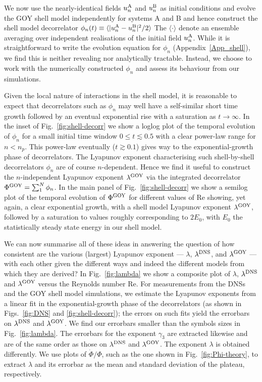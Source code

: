 \documentclass[amsmath,amssymb,amsbsy,pre,twocolumn,tightenlines,superscriptaddress,floatfix]{revtex4-2}
\begin{document}
We now use the nearly-identical fields $u_n^{\rm A}$ and $u_n^{\rm B}$ as
initial conditions and evolve the GOY shell model independently for systems A and B
and hence construct the shell model decorrelator $\phi_n (t) \equiv \langle |u_n^{\rm A} - u_n^{\rm B}|^2 / 2\rangle$
The $\langle \cdot \rangle$ denote an ensemble averaging over independent realisations of the initial field
$u_n^{\rm A}$. While it is straightforward to write the evolution equation for $\phi_n$ (Appendix~\ref{App_shell}), we
find this is neither revealing nor analytically
tractable. Instead, we choose to work with the numerically constructed $\phi_n$ and assess its behaviour from
our simulations.

Given the local nature of interactions in the shell model\cite{Luca_shell}, it is reasonable to
expect that decorrelators such as $\phi_n$ may well have a self-similar short
time growth followed by an eventual exponential rise with a saturation as $t
\to \infty$. In the inset of Fig.~\ref{fig:shell-decorr} we show a loglog
plot of the temporal evolution of $\phi_n$ for a small initial time window $0
\le t \lesssim 0.5$ with a clear power-law range for $n < n_p$. This power-law eventually ($t \gtrsim 0.1$) gives way
to the
exponential-growth phase of
decorrelators. The
Lyapunov exponent characterising such shell-by-shell decorrelators $\phi_n$ are
of course $n$-dependent. Hence we find it useful to construct the $n$-independent Lyapunov exponent $\lambda^{\rm GOY}$
via the integrated decorrelator $\Phi^{\rm GOY} = \sum_1^N \phi_n$.
In the main panel of Fig.~\ref{fig:shell-decorr} we show a semilog plot of the
temporal evolution of $\Phi^{\rm GOY}$ for different values of Re
showing, yet again, a clear exponential growth, with a shell model Lyapunov exponent
$\lambda^{\rm GOY}$, followed by a saturation to
values roughly corresponding to $2E_0$, with $E_0$ the statistically
steady state energy in our shell model.

We can now summarise all of these ideas in answering the
question of how consistent are the various (largest) Lyapunov exponent ---
$\lambda$, $\lambda^{\rm DNS}$, and $\lambda^{\rm GOY}$ --- with each other given the
different ways and indeed the different models from which they are derived?
In Fig.~\ref{fig:lambda} we show a composite plot of $\lambda$, $\lambda^{\rm
DNS}$ and $\lambda^{\rm GOY}$ versus the
Reynolds number Re. For measurements from the DNSs and the GOY shell model
simulations, we estimate the Lyapunov exponents from a linear fit in the
exponential-growth
phase of the decorrelators (as shown in Figs.~\ref{fig:DNS} and
\ref{fig:shell-decorr}); the errors on such fits yield the errorbars on
$\lambda^{\rm DNS}$ and $\lambda^{\rm GOY}$. We find our errorbars smaller than
the symbols sizes in Fig.~\ref{fig:lambda}. The errorbars for the exponent
$\gamma_3$ are extracted likewise and are of the same order as those on
$\lambda^{\rm DNS}$ and $\lambda^{\rm GOY}$.  The exponent $\lambda$ is
obtained differently. We use plots of $\dot{\Phi}/\Phi$, such as the one shown
in Fig.~\ref{fig:Phi-theory}, to extract $\lambda$ and its errorbar as the mean
and standard deviation of the plateau, respectively.
\end{document}
